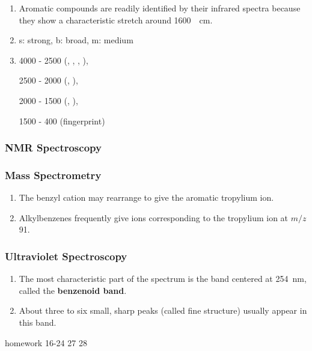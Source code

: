 \begin{enumerate}
    \item Aromatic compounds are readily identified by their infrared spectra because they show a characteristic  stretch around \qty{1600}{\per\centi\meter}.
    \item s: strong, b: broad, m: medium
    \item 4000 - 2500 (, , , ),
    
    2500 - 2000 (, ),
    
    2000 - 1500 (, ),
    
    1500 - 400 (fingerprint)
\end{enumerate}

\subsubsection{NMR Spectroscopy}

\subsubsection{Mass Spectrometry}

\begin{enumerate}
    \item The benzyl cation may rearrange to give the aromatic tropylium ion. 
    \item Alkylbenzenes frequently give ions corresponding to the tropylium ion at $ m/z $ 91.
\end{enumerate}

\subsubsection{Ultraviolet Spectroscopy}

\begin{enumerate}
    \item The most characteristic part of the spectrum is the band centered at \qty{254}{\nano\meter}, called the \textbf{benzenoid band}.
    \item About three to six small, sharp peaks (called fine structure) usually appear in this band.
\end{enumerate}
homework 16-24 27 28
